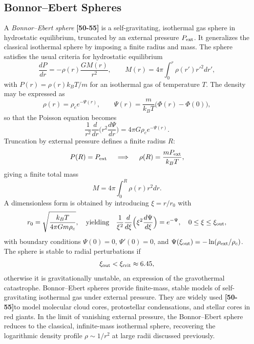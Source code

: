 \documentclass[12pt,a4paper]{article}
\numberwithin{equation}{section}
\begin{document}
\subsection{Bonnor--Ebert Spheres}
A \emph{Bonnor--Ebert sphere} \textbf{[50-55]} is a self-gravitating, isothermal gas sphere in hydrostatic equilibrium, truncated by an external pressure $P_{\rm ext}$. It generalizes the classical isothermal sphere by imposing a finite radius and mass. The sphere satisfies the usual criteria for hydrostatic equilibrium
\begin{equation}
\frac{dP}{dr} = - \rho(r) \frac{G M(r)}{r^2}, \qquad
M(r) = 4 \pi \int_0^r \rho(r') r'^2 dr',
\end{equation}
with $P(r) = \rho(r) k_B T / m$ for an isothermal gas of temperature $T$. The density may be expressed as
\begin{equation}
\rho(r) = \rho_c e^{-\Psi(r)}, \qquad
\Psi(r) = \frac{m}{k_B T} \big(\Phi(r) - \Phi(0)\big),
\end{equation}
so that the Poisson equation becomes
\begin{equation}
\frac{1}{r^2} \frac{d}{dr} \Big( r^2 \frac{d\Psi}{dr} \Big) = 4 \pi G \rho_c e^{-\Psi(r)}.
\end{equation}
Truncation by external pressure defines a finite radius $R$:
\begin{equation}
P(R) = P_{\rm ext} \quad \implies \quad \rho(R) = \frac{m P_{\rm ext}}{k_B T},
\end{equation}
giving a finite total mass
\begin{equation}
M = 4 \pi \int_0^R \rho(r) r^2 dr.
\end{equation}
A dimensionless form is obtained by introducing $\xi = r / r_0$ with
\begin{equation}
r_0 = \sqrt{\frac{k_B T}{4 \pi G m \rho_c}},
\quad \text{yielding} \quad
\frac{1}{\xi^2} \frac{d}{d\xi} \Big( \xi^2 \frac{d\Psi}{d\xi} \Big) = e^{-\Psi},
\quad 0 \le \xi \le \xi_{\rm out},
\end{equation}
with boundary conditions $\Psi(0)=0$, $\Psi'(0)=0$, and \(\Psi(\xi_{\rm out}) = -\ln(\rho_{\rm ext}/\rho_c)\). The sphere is stable to radial perturbations if
\begin{equation*}
\xi_{\rm out} < \xi_{\rm crit} \approx 6.45,
\end{equation*}
otherwise it is gravitationally unstable, an expression of the gravothermal catastrophe. Bonnor--Ebert spheres provide finite-mass, stable models of self-gravitating isothermal gas under external pressure. They are widely used \textbf{[50-55]}to model molecular cloud cores, protostellar condensations, and stellar cores in red giants. In the limit of vanishing external pressure, the Bonnor--Ebert sphere reduces to the classical, infinite-mass isothermal sphere, recovering the logarithmic density profile $\rho \sim 1/r^2$ at large radii discussed previously.
\end{document}
